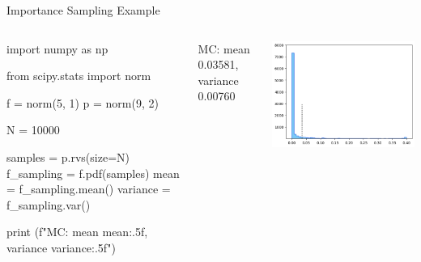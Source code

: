 \documentclass{beamer}
\begin{document}
\begin{frame}[fragile]{Importance Sampling Example}
\begin{columns}
\begin{ipython}
import numpy as np

from scipy.stats import norm
	
f = norm(5, 1)
p = norm(9, 2)
	
N = 10000

samples = p.rvs(size=N)
f_sampling = f.pdf(samples)
mean = f_sampling.mean()
variance = f_sampling.var()

print (f"MC: mean {mean:.5f}, variance {variance:.5f}")
\end{ipython}
\begin{ioutput}

MC: mean 0.03581, variance 0.00760
\end{ioutput}
\begin{center}
	\includegraphics[width=0.8\linewidth]{images/mc_nois}
\end{center}
\end{columns}
\end{frame}
\end{document}

